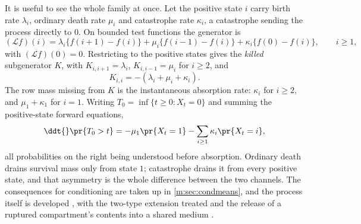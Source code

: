 It is useful to see the whole family at once. Let the positive state $i$ carry
birth rate $\lambda_i$, ordinary death rate $\mu_i$ and catastrophe rate
$\kappa_i$, a catastrophe sending the process directly to $0$. On bounded test
functions the generator is
\begin{equation}
\label{m:eq:bdcgenerator}
(\mathcal Lf)(i)
= \lambda_i\{f(i+1)-f(i)\} + \mu_i\{f(i-1)-f(i)\} + \kappa_i\{f(0)-f(i)\},
\qquad i\ge1,
\end{equation}
with $(\mathcal Lf)(0)=0$. Restricting to the positive states gives the
\emph{killed} subgenerator $K$, with $K_{i,i+1}=\lambda_i$, $K_{i,i-1}=\mu_i$ for
$i\ge2$, and
\begin{equation}
\label{m:eq:killedsubgen}
K_{i,i} = -(\lambda_i+\mu_i+\kappa_i) .
\end{equation}
The row mass missing from $K$ is the instantaneous absorption rate: $\kappa_i$ for
$i\ge2$, and $\mu_1+\kappa_1$ for $i=1$. Writing $T_0=\inf\{t\ge0:X_t=0\}$ and
summing the positive-state forward equations,
\begin{equation}
\label{m:eq:bdcsurvivalloss}
\ddt{}\pr{T_0>t}
= -\mu_1\pr{X_t=1} - \sum_{i\ge1}\kappa_i\pr{X_t=i},
\end{equation}
all probabilities on the right being understood before absorption. Ordinary death
drains survival mass only from state $1$; catastrophe drains it from every positive
state, and that asymmetry is the whole difference between the two channels. The
consequences for conditioning are taken up in \cref{m:sec:condmeans}, and the
process itself is developed , with the two-type extension treated
 and the release of a
ruptured compartment's contents into a shared medium
.

